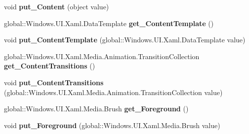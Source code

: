 \begin{DoxyCompactItemize}
void {\bfseries put\+\_\+\+Content} (object value)
\item 
\mbox{\label{interface_windows_1_1_u_i_1_1_xaml_1_1_controls_1_1_i_content_presenter_a5ba47cb8cb89765bea45f2242ad31a45}} 
global\+::\+Windows.\+U\+I.\+Xaml.\+Data\+Template {\bfseries get\+\_\+\+Content\+Template} ()
\item 
\mbox{\label{interface_windows_1_1_u_i_1_1_xaml_1_1_controls_1_1_i_content_presenter_a74180212284ee21c083ea156f117cb3c}} 
void {\bfseries put\+\_\+\+Content\+Template} (global\+::\+Windows.\+U\+I.\+Xaml.\+Data\+Template value)
\item 
\mbox{\label{interface_windows_1_1_u_i_1_1_xaml_1_1_controls_1_1_i_content_presenter_a0db45f8a30518615e50e4f98e8bcc040}} 
global\+::\+Windows.\+U\+I.\+Xaml.\+Media.\+Animation.\+Transition\+Collection {\bfseries get\+\_\+\+Content\+Transitions} ()
\item 
\mbox{\label{interface_windows_1_1_u_i_1_1_xaml_1_1_controls_1_1_i_content_presenter_af8f3017b639541ee85c82042f3186506}} 
void {\bfseries put\+\_\+\+Content\+Transitions} (global\+::\+Windows.\+U\+I.\+Xaml.\+Media.\+Animation.\+Transition\+Collection value)
\item 
\mbox{\label{interface_windows_1_1_u_i_1_1_xaml_1_1_controls_1_1_i_content_presenter_a95c7018f0564a23c7ab641c21ab2cf47}} 
global\+::\+Windows.\+U\+I.\+Xaml.\+Media.\+Brush {\bfseries get\+\_\+\+Foreground} ()
\item 
\mbox{\label{interface_windows_1_1_u_i_1_1_xaml_1_1_controls_1_1_i_content_presenter_a77229ce3c46ba5f9ecb3fbe3361e9c0a}} 
void {\bfseries put\+\_\+\+Foreground} (global\+::\+Windows.\+U\+I.\+Xaml.\+Media.\+Brush value)
\item 
\mbox{\label{interface_windows_1_1_u_i_1_1_xaml_1_1_controls_1_1_i_content_presenter_ae239eb9dcb8ffce9b1af514ec96d232c}} 

\end{DoxyCompactItemize}
